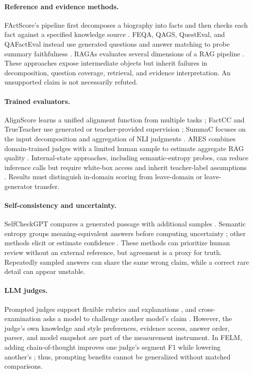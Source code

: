 \documentclass[11pt]{article}
\begin{document}
\paragraph{Reference and evidence methods.} FActScore's pipeline first decomposes a biography into facts and then checks each fact against a specified knowledge source \citep{C07}. FEQA, QAGS, QuestEval, and QAFactEval instead use generated questions and answer matching to probe summary faithfulness \citep{I042,I062,I043,I086}. RAGAs evaluates several dimensions of a RAG pipeline \citep{I057}. These approaches expose intermediate objects but inherit failures in decomposition, question coverage, retrieval, and evidence interpretation. An unsupported claim is not necessarily refuted.

\paragraph{Trained evaluators.} AlignScore learns a unified alignment function from multiple tasks \citep{C09}; FactCC and TrueTeacher use generated or teacher-provided supervision \citep{I073,I095}; SummaC focuses on the input decomposition and aggregation of NLI judgments \citep{I092}. ARES combines domain-trained judges with a limited human sample to estimate aggregate RAG quality \citep{I044}. Internal-state approaches, including semantic-entropy probes, can reduce inference calls but require white-box access and inherit teacher-label assumptions \citep{I090}. Results must distinguish in-domain scoring from leave-domain or leave-generator transfer.

\paragraph{Self-consistency and uncertainty.} SelfCheckGPT compares a generated passage with additional samples \citep{C08}. Semantic entropy groups meaning-equivalent answers before computing uncertainty \citep{C10}; other methods elicit or estimate confidence \citep{I083,I075}. These methods can prioritize human review without an external reference, but agreement is a proxy for truth. Repeatedly sampled answers can share the same wrong claim, while a correct rare detail can appear unstable.

\paragraph{LLM judges.} Prompted judges support flexible rubrics and explanations \citep{I065,I100}, and cross-examination asks a model to challenge another model's claim \citep{I104}. However, the judge's own knowledge and style preferences, evidence access, answer order, parser, and model snapshot are part of the measurement instrument. In FELM, adding chain-of-thought improves one judge's segment F1 while lowering another's \citep{C13}; thus, prompting benefits cannot be generalized without matched comparisons.
\end{document}
